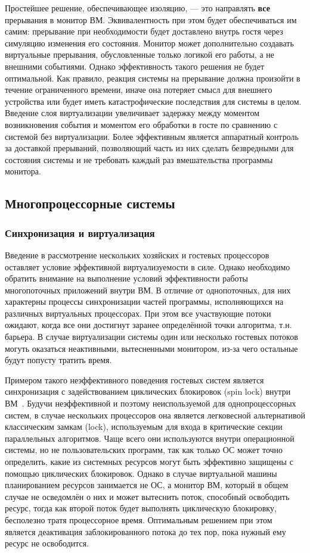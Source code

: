 Простейшее решение, обеспечивающее изоляцию, --- это направлять \textbf{все} прерывания в монитор ВМ. Эквивалентность при этом будет обеспечиваться им самим: прерывание при необходимости будет доставлено внутрь гостя через симуляцию изменения его состояния. Монитор может дополнительно создавать виртуальные прерывания, обусловленные только логикой его работы, а не внешними событиями. Однако эффективность такого решения не будет оптимальной. Как правило, реакция системы на прерывание должна произойти в течение ограниченного времени, иначе она потеряет смысл для внешнего устройства или будет иметь катастрофические последствия для системы в целом. Введение слоя виртуализации увеличивает задержку между моментом  возникновения события и моментом его обработки в госте по сравнению с системой без виртуализации. Более эффективным является аппаратный контроль за доставкой прерываний, позволяющий часть из них сделать безвредными для состояния системы и не требовать каждый раз вмешательства программы монитора.

\subsection{Многопроцессорные системы}

\subsubsection{Синхронизация и виртуализация}

Введение в рассмотрение нескольких хозяйских и гостевых процессоров оставляет условие эффективной виртуализуемости в силе. Однако необходимо обратить внимание на выполнение условий эффективности работы многопоточных приложений внутри ВМ. В отличие от однопоточных, для них характерны процессы синхронизации частей программы, исполняющихся на различных виртуальных процессорах. При этом все участвующие потоки ожидают, когда все они достигнут заранее определённой точки алгоритма, т.н. барьера. В случае виртуализации системы один или несколько гостевых потоков могуть оказаться неактивными, вытесненными монитором, из-за чего остальные будут попусту тратить время.

Примером такого неэффективного поведения гостевых систем является синхронизация с задействованием циклических блокировок (\abbr spin lock) внутри ВМ~\cite{southern-v12n}. Будучи неэффективной и поэтому неиспользуемой для однопроцессорных систем, в случае нескольких процессоров она является легковесной альтернативой классическим замкам (\abbr lock), используемым для входа в критические секции параллельных алгоритмов. Чаще всего они используются внутри операционной системы, но не пользовательских программ, так как только ОС может точно определить, какие из системных ресурсов могут быть эффективно защищены с помощью циклических блокировок. Однако в случае виртуальной машины планированием ресурсов занимается не ОС, а монитор ВМ, который в общем случае не осведомлён о них и может вытеснить поток, способный освободить ресурс, тогда как второй поток будет выполнять циклическую блокировку, бесполезно тратя процессорное время. Оптимальным решением при этом является деактивация заблокированного потока до тех пор, пока нужный ему ресурс не освободится.


